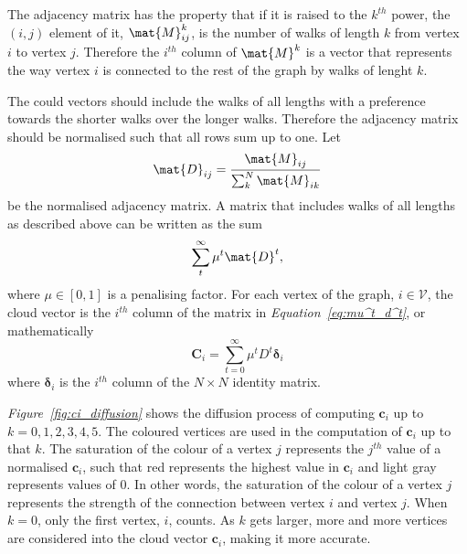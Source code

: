 \documentclass[12pt]{report}
\begin{document}
The adjacency matrix has the property that if it is raised to the $k^{th}$ power,
the $(i, j)$ element of it, $\mat{M}^k_{ij}$, is the number of walks of length
$k$ from vertex $i$ to vertex $j$. Therefore the $i^{th}$ column of $\mat{M}^k$
is a vector that represents the way vertex $i$ is connected to the rest of the
graph by walks of lenght $k$.

The could vectors should include the walks of all lengths with a preference
towards the shorter walks over the longer walks. Therefore the adjacency matrix
should be normalised such that all rows sum up to one. Let
%
\begin{equation}
\label{eq:initial-d}
\mat{D}_{ij} = \frac{\mat{M}_{ij}}{\sum_k^N \mat{M}_{ik}}
\end{equation}
be the normalised adjacency matrix. A matrix that includes walks of all lengths
as described above can be written as the sum
%
\begin{equation}
\label{eq:mu^t_d^t}
\sum_t^\infty \mu^t \mat{D}^t,
\end{equation}
%
where $\mu \in [0,1]$ is a penalising factor. For each vertex of the graph, $i
\in \mathcal{V}$, the cloud vector is the $i^{th}$ column of the matrix in
\emph{Equation~\ref{eq:mu^t_d^t}}, or mathematically
%
\begin{equation}
\label{eq:brute-ci}
\bm{C}_i = \sum_{t=0}^\infty \mu^t D^t \bm{\delta}_i
\end{equation}
%
where $\bm{\delta}_i$ is the $i^{th}$ column of the $N \times N$ identity matrix.

\emph{Figure~\ref{fig:ci_diffusion}} shows the diffusion process of computing
$\bm{c}_i$ up to $k = 0, 1, 2, 3, 4, 5$. The coloured vertices are used in the
computation of $\bm{c}_i$ up to that $k$. The saturation of the colour of a vertex
$j$ represents the $j^{th}$ value of a normalised $\bm{c}_i$, such that red
represents the highest value in $\bm{c}_i$ and light gray represents values of 0.
In other words, the saturation of the colour of a vertex $j$ represents the strength
of the connection between vertex $i$ and vertex $j$. When $k=0$, only the first
vertex, $i$, counts. As $k$ gets larger, more and more vertices are considered
into the cloud vector $\bm{c}_i$, making it more accurate.
\end{document}
